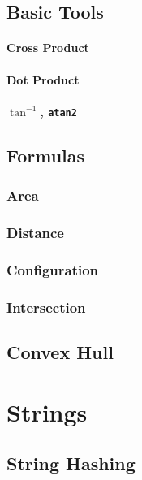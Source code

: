 \documentclass[11pt]{book}
\begin{document}
\section{Basic Tools}

\subsubsection{Cross Product}

\subsubsection{Dot Product}

\subsubsection{$\tan^{-1}$, \texttt{atan2}}

\section{Formulas}

\subsection{Area}

\subsection{Distance}

\subsection{Configuration}

\subsection{Intersection}

\section{Convex Hull}

\chapter{Strings}

\section{String Hashing}
\end{document}
